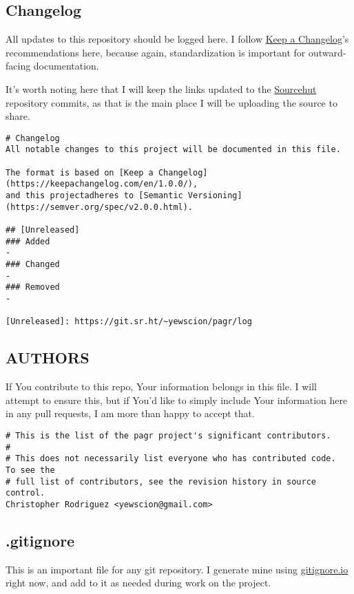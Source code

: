 \documentclass[11pt]{article}
\begin{document}
\subsection{Changelog}
\label{sec:org1c6bc0d}
All updates to this repository should be logged here. I follow \href{https://keepachangelog.com/}{Keep a
Changelog}'s recommendations here, because again, standardization is important
for outward-facing documentation.

It's worth noting here that I will keep the links updated to the \href{https://sr.ht/}{Sourcehut}
repository commits, as that is the main place I will be uploading the source to
share.

\begin{verbatim}
# Changelog
All notable changes to this project will be documented in this file.

The format is based on [Keep a Changelog](https://keepachangelog.com/en/1.0.0/),
and this projectadheres to [Semantic Versioning](https://semver.org/spec/v2.0.0.html).

## [Unreleased]
### Added
-
### Changed
-
### Removed
-

[Unreleased]: https://git.sr.ht/~yewscion/pagr/log
\end{verbatim}

\subsection{AUTHORS}
\label{sec:org572e103}
If You contribute to this repo, Your information belongs in this file. I will
attempt to ensure this, but if You'd like to simply include Your information
here in any pull requests, I am more than happy to accept that.

\begin{verbatim}
# This is the list of the pagr project's significant contributors.
#
# This does not necessarily list everyone who has contributed code.  To see the
# full list of contributors, see the revision history in source control.
Christopher Rodriguez <yewscion@gmail.com>
\end{verbatim}

\subsection{.gitignore}
\label{sec:org3ce2d18}
This is an important file for any git repository. I generate mine using
\href{https://www.toptal.com/developers/gitignore}{gitignore.io} right now, and add to it as needed during work on the project.
\end{document}

